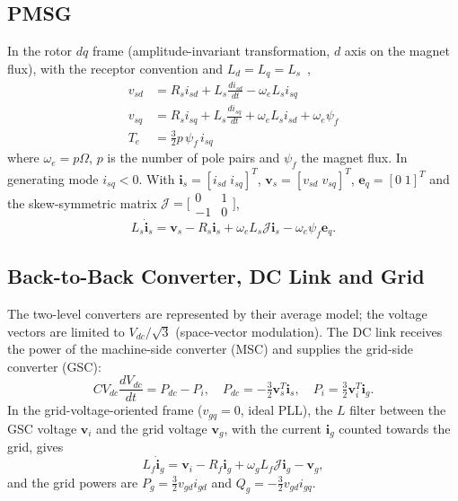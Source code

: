 \documentclass[conference]{IEEEtran}
\newcommand{\bv}[1]{\mathbf{#1}}
\newcommand{\Jm}{\boldsymbol{\mathcal{J}}}
\begin{document}
\subsection{PMSG}
In the rotor $dq$ frame (amplitude-invariant transformation, $d$ axis on the magnet flux), with the
receptor convention and $L_d=L_q=L_s$~\cite{wu2011},
\begin{align}
v_{sd} &= R_s i_{sd} + L_s\frac{di_{sd}}{dt} - \omega_e L_s i_{sq}\label{eq:vsd}\\
v_{sq} &= R_s i_{sq} + L_s\frac{di_{sq}}{dt} + \omega_e L_s i_{sd} + \omega_e\psi_f\label{eq:vsq}\\
T_e &= \tfrac32 p\,\psi_f\, i_{sq}\label{eq:te}
\end{align}
where $\omega_e=p\Omega$, $p$ is the number of pole pairs and $\psi_f$ the magnet flux. In generating mode
$i_{sq}<0$. With $\bv{i}_s=[i_{sd}\;i_{sq}]^T$, $\bv{v}_s=[v_{sd}\;v_{sq}]^T$, $\bv{e}_q=[0\;1]^T$ and
the skew-symmetric matrix $\Jm=\bigl[\begin{smallmatrix}0&1\\-1&0\end{smallmatrix}\bigr]$,
\begin{equation}
L_s\dot{\bv{i}}_s = \bv{v}_s - R_s\bv{i}_s + \omega_eL_s\Jm\bv{i}_s - \omega_e\psi_f\bv{e}_q .
\label{eq:pmsg}
\end{equation}

\subsection{Back-to-Back Converter, DC Link and Grid}
The two-level converters are represented by their average model; the voltage vectors are limited to
$V_{dc}/\sqrt3$ (space-vector modulation). The DC link receives the power of the machine-side converter
(MSC) and supplies the grid-side converter (GSC):
\begin{equation}
CV_{dc}\frac{dV_{dc}}{dt} = P_{dc} - P_i,\quad P_{dc}=-\tfrac32\bv{v}_s^T\bv{i}_s,\quad
P_i=\tfrac32\bv{v}_i^T\bv{i}_g .
\label{eq:dc}
\end{equation}
In the grid-voltage-oriented frame ($v_{gq}=0$, ideal PLL), the $L$ filter between the GSC voltage
$\bv{v}_i$ and the grid voltage $\bv{v}_g$, with the current $\bv{i}_g$ counted towards the grid, gives
\begin{equation}
L_f\dot{\bv{i}}_g = \bv{v}_i - R_f\bv{i}_g + \omega_gL_f\Jm\bv{i}_g - \bv{v}_g ,
\label{eq:filter}
\end{equation}
and the grid powers are $P_g=\frac32v_{gd}i_{gd}$ and $Q_g=-\frac32v_{gd}i_{gq}$.
\end{document}
